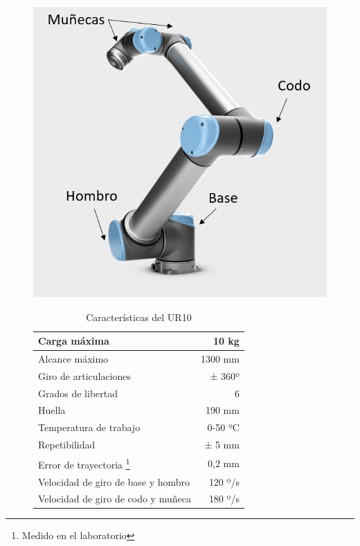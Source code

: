 \begin{table}
    \begin{subfigure}[h!]{0.45\textwidth}
        \includegraphics[scale=0.5]{figuras/articulaciones_UR.png}
        \label{fig:articulaciones_UR}
    \end{subfigure}
    \hfill
    \begin{subfigure}[h!]{0.7\textwidth}
        \begin{tabular}{|l|r|}
            \hline
            Carga máxima & 10 kg \\
            \hline
            Alcance máximo & 1300 mm \\
            \hline
            Giro de articulaciones & ± 360º \\
            \hline
            Grados de libertad & 6 \\
            \hline
            Huella & 190 mm \\
            \hline
            Temperatura de trabajo & 0-50 ºC \\
            \hline
            Repetibilidad & ± 5 mm \\
            \hline
            Error de trayectoria \footnote{Medido en el laboratorio} & 0,2 mm \\
            \hline
            Velocidad de giro de base y hombro & 120 º/s \\
            \hline
            Velocidad de giro de codo y muñeca & 180 º/s \\
            \hline
        \end{tabular}
        \label{tab:caracteristicas_UR_tabla}
    \end{subfigure}
    \caption{Características del UR10 \cite{UR_Technical_Specs}}
    \label{tab:caracteristicas_UR}
\end{table}




